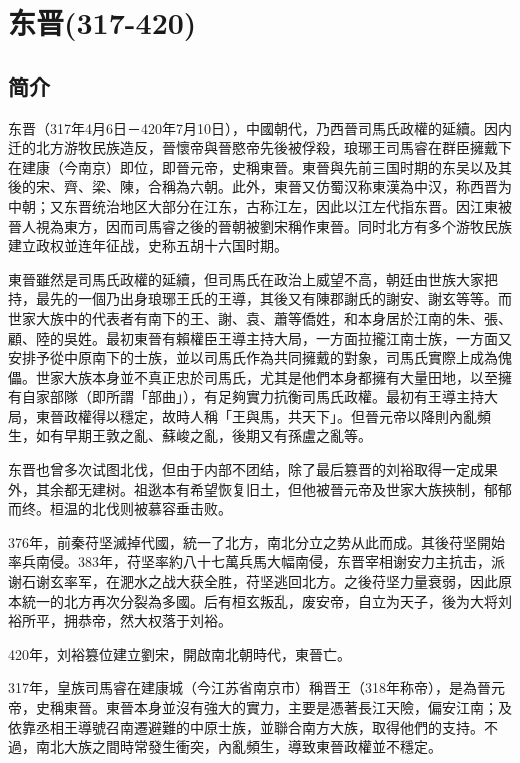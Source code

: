 
\chapter{东晋\tiny(317-420)}

\section{简介}

东晋（317年4月6日－420年7月10日），中國朝代，乃西晉司馬氏政權的延續。因内迁的北方游牧民族造反，晉懷帝與晉愍帝先後被俘殺，琅琊王司馬睿在群臣擁戴下在建康（今南京）即位，即晉元帝，史稱東晉。東晉與先前三国时期的东吴以及其後的宋、齊、梁、陳，合稱為六朝。此外，東晉又仿蜀汉称東漢為中汉，称西晋为中朝；又东晋统治地区大部分在江东，古称江左，因此以江左代指东晋。因江東被晉人視為東方，因而司馬睿之後的晉朝被劉宋稱作東晉。同时北方有多个游牧民族建立政权並连年征战，史称五胡十六国时期。

東晉雖然是司馬氏政權的延續，但司馬氏在政治上威望不高，朝廷由世族大家把持，最先的一個乃出身琅琊王氏的王導，其後又有陳郡謝氏的謝安、謝玄等等。而世家大族中的代表者有南下的王、謝、袁、蕭等僑姓，和本身居於江南的朱、張、顧、陸的吳姓。最初東晉有賴權臣王導主持大局，一方面拉攏江南士族，一方面又安排予從中原南下的士族，並以司馬氏作為共同擁戴的對象，司馬氏實際上成為傀儡。世家大族本身並不真正忠於司馬氏，尤其是他們本身都擁有大量田地，以至擁有自家部隊（即所謂「部曲」），有足夠實力抗衡司馬氏政權。最初有王導主持大局，東晉政權得以穩定，故時人稱「王與馬，共天下」。但晉元帝以降則內亂頻生，如有早期王敦之亂、蘇峻之亂，後期又有孫盧之亂等。

东晋也曾多次试图北伐，但由于内部不团结，除了最后篡晋的刘裕取得一定成果外，其余都无建树。祖逖本有希望恢复旧土，但他被晉元帝及世家大族挾制，郁郁而终。桓温的北伐则被慕容垂击败。

376年，前秦苻坚滅掉代國，統一了北方，南北分立之势从此而成。其後苻坚開始率兵南侵。383年，苻坚率約八十七萬兵馬大幅南侵，东晋宰相谢安力主抗击，派谢石谢玄率军，在淝水之战大获全胜，苻坚逃回北方。之後苻坚力量衰弱，因此原本統一的北方再次分裂為多國。后有桓玄叛乱，废安帝，自立为天子，後为大将刘裕所平，拥恭帝，然大权落于刘裕。

420年，刘裕篡位建立劉宋，開啟南北朝時代，東晉亡。

317年，皇族司馬睿在建康城（今江苏省南京市）稱晋王（318年称帝），是為晉元帝，史稱東晉。東晉本身並沒有強大的實力，主要是憑著長江天險，偏安江南；及依靠丞相王導號召南遷避難的中原士族，並聯合南方大族，取得他們的支持。不過，南北大族之間時常發生衝突，內亂頻生，導致東晉政權並不穩定。

